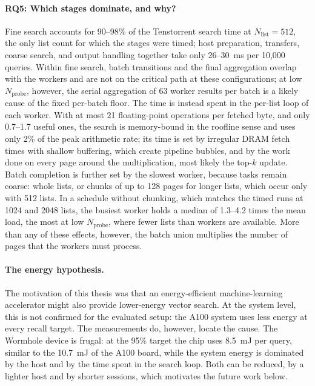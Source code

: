 \paragraph{RQ5: Which stages dominate, and why?}
Fine search accounts for 90--98\% of the Tenstorrent search time at
\(N_{\mathrm{list}}=512\), the only list count for which the stages were
timed; host preparation, transfers, coarse search, and
output handling together take only 26--30~ms per 10,000 queries. Within fine
search, batch transitions and the final aggregation overlap with the workers
and are not on the critical path at these configurations; at low
\(N_{\mathrm{probe}}\), however, the serial aggregation of 63 worker results
per batch is a likely cause of the fixed per-batch floor. The time is instead spent in the per-list
loop of each worker. With at most 21 floating-point operations per fetched
byte, and only 0.7--1.7 useful ones, the search is memory-bound in the roofline
sense and uses only 2\% of the peak arithmetic rate; its time is set by
irregular DRAM fetch times with shallow buffering, which create pipeline
bubbles, and by the work done on every page around the multiplication, most
likely the top-\(k\) update. Batch completion is
further set by the slowest worker, because tasks remain coarse: whole lists,
or chunks of up to 128 pages for longer lists, which occur only with 512
lists. In a schedule without chunking, which matches the timed runs at 1024
and 2048 lists, the busiest worker holds a median of 1.3--4.2 times the mean
load, the most at low \(N_{\mathrm{probe}}\), where fewer lists than workers
are available. More than any of these effects, however, the batch union
multiplies the number of pages that the workers must process.

\paragraph{The energy hypothesis.}
The motivation of this thesis was that an energy-efficient machine-learning
accelerator might also provide lower-energy vector search. At the system level,
this is not confirmed for the evaluated setup: the A100 system uses less energy
at every recall target. The measurements do, however, locate the cause. The
Wormhole device is frugal: at the 95\% target the chip uses 8.5~mJ per query,
similar to the 10.7~mJ of the A100 board, while the system energy is dominated
by the host and by the time spent in the search loop. Both can be reduced,
by a lighter host and by shorter sessions, which motivates the future work
below.

